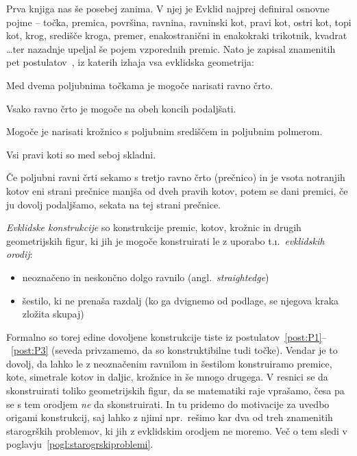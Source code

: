 Prva knjiga nas še posebej zanima. V njej je Evklid najprej definiral osnovne pojme -- točka, premica, površina, ravnina, ravninski kot, pravi kot, ostri kot, topi kot, krog, središče kroga, premer, enakostranični in enakokraki trikotnik, kvadrat \ldots ter nazadnje upeljal še pojem vzporednih premic. Nato je zapisal znamenitih pet postulatov~\cite{euclidI}, iz katerih izhaja vsa evklidska geometrija:

\renewcommand{\thepostulat}{P\arabic{postulat}}

\begin{postulat}
    \label{post:P1}
    Med dvema poljubnima točkama je mogoče narisati ravno črto.
\end{postulat}
\begin{postulat}
    \label{post:P2}
    Vsako ravno črto je mogoče na obeh koncih podaljšati.
\end{postulat}
\begin{postulat}
    \label{post:P3}
    Mogoče je narisati krožnico s poljubnim središčem in poljubnim polmerom.
\end{postulat}
\begin{postulat}
    \label{post:P4}
    Vsi pravi koti so med seboj skladni.
\end{postulat}
\begin{postulat}
    \label{post:P5}
    Če poljubni ravni črti sekamo s tretjo ravno črto (prečnico) in je vsota notranjih kotov eni strani prečnice manjša od dveh pravih kotov, potem se dani premici, če ju dovolj podaljšamo, sekata na tej strani prečnice.
\end{postulat}

\emph{Evklidske konstrukcije} so konstrukcije premic, kotov, krožnic in drugih geometrijskih figur, ki jih je mogoče konstruirati le z uporabo t.\i.\ \emph{evklidskih orodij}:

\begin{itemize}
    \item neoznačeno in neskončno dolgo ravnilo (angl.\ \emph{straightedge})
    \item šestilo, ki ne prenaša razdalj (ko ga dvignemo od podlage, se njegova kraka zložita skupaj)
\end{itemize}

Formalno so torej edine dovoljene konstrukcije tiste iz postulatov~\ref{post:P1}--~\ref{post:P3} (seveda privzamemo, da so konstruktibilne tudi točke). Vendar je to dovolj, da lahko le z neoznačenim ravnilom in šestilom konstruiramo premice, kote, simetrale kotov in daljic, krožnice in še mnogo drugega. V resnici se da skonstruirati toliko geometrijskih figur, da se matematiki raje vprašamo, česa pa se s tem orodjem \emph{ne} da skonstruirati. In tu pridemo do motivacije za uvedbo origami konstrukcij, saj lahko z njimi npr.\ rešimo kar dva od treh znamenitih starogrških problemov, ki jih z evklidskim orodjem ne moremo. Več o tem sledi v poglavju~\ref{pogl:starogrskiproblemi}.


